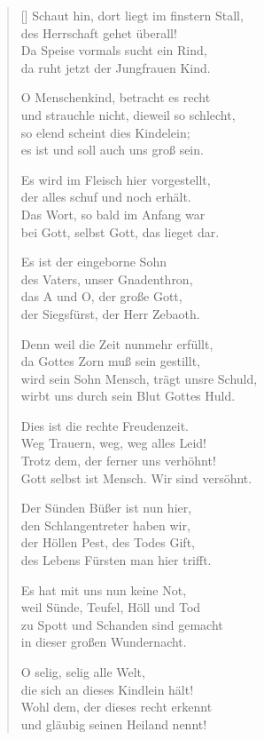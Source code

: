 \begin{multicols}{2}
\begin{verse}[\versewidth]
 Schaut hin, dort liegt im finstern Stall,\\
des Herrschaft gehet überall!\\
Da Speise vormals sucht ein Rind,\\
da ruht jetzt der Jungfrauen Kind.
 
 O Menschenkind, betracht es recht\\
und strauchle nicht, dieweil so schlecht,\\
so elend scheint dies Kindelein;\\
es ist und soll auch uns groß sein.
 
 Es wird im Fleisch hier vorgestellt,\\
der alles schuf und noch erhält.\\
Das Wort, so bald im Anfang war\\
bei Gott, selbst Gott, das lieget dar.
 
 Es ist der eingeborne Sohn\\
des Vaters, unser Gnadenthron,\\
das A und O, der große Gott,\\
der Siegsfürst, der Herr Zebaoth.
 
 Denn weil die Zeit nunmehr erfüllt,\\
da Gottes Zorn muß sein gestillt,\\
wird sein Sohn Mensch, trägt unsre Schuld,\\
wirbt uns durch sein Blut Gottes Huld.
 
 Dies ist die rechte Freudenzeit.\\
Weg Trauern, weg, weg alles Leid!\\
Trotz dem, der ferner uns verhöhnt!\\
Gott selbst ist Mensch. Wir sind versöhnt.
 
 Der Sünden Büßer ist nun hier,\\
den Schlangentreter haben wir,\\
der Höllen Pest, des Todes Gift,\\
des Lebens Fürsten man hier trifft.
 
 Es hat mit uns nun keine Not,\\
weil Sünde, Teufel, Höll und Tod\\
zu Spott und Schanden sind gemacht\\
in dieser großen Wundernacht.
 
 O selig, selig alle Welt,\\
die sich an dieses Kindlein hält!\\
Wohl dem, der dieses recht erkennt\\
und gläubig seinen Heiland nennt!
 

\end{verse}
\end{multicols}
